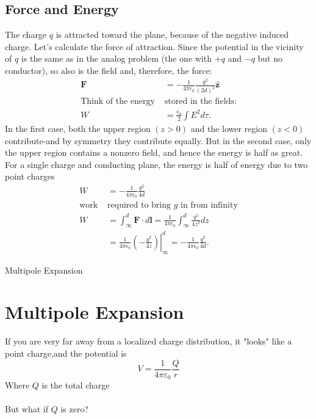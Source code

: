 \subsection{Force and Energy}
The charge $q$ is attracted toward the plane, because of the negative induced charge. Let's calculate the force of attraction. Since the potential in the vicinity of $q$ is the same as in the analog problem (the one with $+q$ and $-q$ but no conductor), so also is the field and, therefore, the force:
\begin{align*}
\mathbf{F}&=-\frac{1}{4 \pi \epsilon_{0}} \frac{q^{2}}{(2 d)^{2}} \hat{\mathbf{z}} \\
\text{Think of the energy }&\text{stored in the fields:}\\
W&=\frac{\epsilon_{0}}{2} \int E^{2} d \tau .
\end{align*}
In the first case, both the upper region $(z>0)$ and the lower region $(z<0)$ contribute-and by symmetry they contribute equally. But in the second case, only the upper region contains a nonzero field, and hence the energy is half as great.\\
For a single charge and conducting plane, the energy is half of energy due to two point charges
\begin{align*}
W&=-\frac{1}{4 \pi \epsilon_{0}} \frac{q^{2}}{4 d}\\
\text{work }&\text{required to bring $g$ in from infinity}\\
W &=\int_{\infty}^{d} \mathbf{F} \cdot d \mathbf{l}=\frac{1}{4 \pi \epsilon_{0}} \int_{\infty}^{d} \frac{q^{2}}{4 z^{2}} d z \\
&=\left.\frac{1}{4 \pi \epsilon_{0}}\left(-\frac{q^{2}}{4 z}\right)\right|_{\infty} ^{d}=-\frac{1}{4 \pi \epsilon_{0}} \frac{q^{2}}{4 d} .
\end{align*}
\newpage 
\begin{abox}
	Multipole Expansion
\end{abox}
\section{Multipole Expansion}
If you are very far away from a localized charge distribution, it "looks" like a point charge,and the potential is
$$V=\frac{1}{4\pi \varepsilon_{0}}\frac{Q}{r}$$
Where $Q$ is the total charge\\\\
But what if $Q$ is zero?
